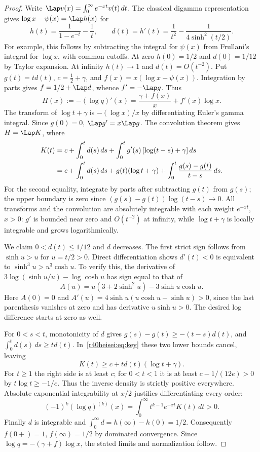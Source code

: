 \documentclass[11pt,a4paper]{article}
\numberwithin{equation}{section}
\theoremstyle{definition}
\theoremstyle{remark}
\begin{document}
\begin{proof}
Write $\Lap v(x)=\int_0^\infty e^{-xt}v(t)\,dt$. The classical digamma representation gives $\log x-\psi(x)=\Lap h(x)$ for
\[
 h(t)=\frac{1}{1-e^{-t}}-\frac1t,\qquad
 d(t)=h'(t)=\frac1{t^2}-\frac1{4\sinh^2(t/2)}.
\]
For example, this follows by subtracting the integral for $\psi(x)$ from Frullani's integral for $\log x$, with common cutoffs. At zero $h(0)=1/2$ and $d(0)=1/12$ by Taylor expansion. At infinity $h(t)\to1$ and $d(t)=O(t^{-2})$. Put $g(t)=td(t)$, $c=\tfrac12+\gamma$, and $f(x)=x(\log x-\psi(x))$. Integration by parts gives $f=1/2+\Lap d$, whence $f'=-\Lap g$. Thus
\[
 H(x):=-(\log q)'(x)=\frac{\gamma+f(x)}x+f'(x)\log x.
\]
The transform of $\log t+\gamma$ is $-(\log x)/x$ by differentiating Euler's gamma integral. Since $g(0)=0$, $\Lap g'=x\Lap g$. The convolution theorem gives $H=\Lap K$, where
\begin{align}
 K(t)&=c+\int_0^t d(s)\,ds+\int_0^t g'(s)\,[\log(t-s)+\gamma] \,ds\notag\\
 &=c+\int_0^t d(s)\,ds+g(t)(\log t+\gamma)
       +\int_0^t\frac{g(s)-g(t)}{t-s}\,ds.\label{r40heisei:eq:key}
\end{align}
For the second equality, integrate by parts after subtracting $g(t)$ from $g(s)$; the upper boundary is zero since $(g(s)-g(t))\log(t-s)\to0$. All transforms and the convolution are absolutely integrable with each weight $e^{-xt}$, $x>0$: $g'$ is bounded near zero and $O(t^{-2})$ at infinity, while $\log t+\gamma$ is locally integrable and grows logarithmically.

We claim $0<d(t)\le1/12$ and $d$ decreases. The first strict sign follows from $\sinh u>u$ for $u=t/2>0$. Direct differentiation shows $d'(t)<0$ is equivalent to $\sinh^3 u>u^3\cosh u$. To verify this, the derivative of $3\log(\sinh u/u)-\log\cosh u$ has sign equal to that of
\[
 A(u)=u(3+2\sinh^2 u)-3\sinh u\cosh u.
\]
Here $A(0)=0$ and $A'(u)=4\sinh u(u\cosh u-\sinh u)>0$, since the last parenthesis vanishes at zero and has derivative $u\sinh u>0$. The desired log difference starts at zero as well.

For $0<s<t$, monotonicity of $d$ gives $g(s)-g(t)\ge-(t-s)d(t)$, and $\int_0^t d(s)\,ds\ge td(t)$. In~\eqref{r40heisei:eq:key} these two lower bounds cancel, leaving
\[
 K(t)\ge c+t d(t)(\log t+\gamma).
\]
For $t\ge1$ the right side is at least $c$; for $0<t<1$ it is at least $c-1/(12e)>0$ by $t\log t\ge-1/e$. Thus the inverse density is strictly positive everywhere. Absolute exponential integrability at $x/2$ justifies differentiating every order:
\[
 (-1)^k(\log q)^{(k)}(x)
 =\int_0^\infty t^{k-1}e^{-xt}K(t)\,dt>0.
\]
Finally $d$ is integrable and $\int_0^\infty d=h(\infty)-h(0)=1/2$. Consequently $f(0+)=1$, $f(\infty)=1/2$ by dominated convergence. Since $\log q=-(\gamma+f)\log x$, the stated limits and normalization follow.
\end{proof}
\end{document}
